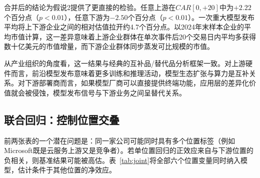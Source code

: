\documentclass[11pt,fontset=fandol,a4paper]{ctexart}
\newcommand{\changed}[1]{#1}
\begin{document}
合并后的结论为假说2提供了更直接的检验。任意上游在$CAR[0,+20]$中为$+2.22$个百分点（$p<0.01$），任意下游为$-2.50$个百分点（$p<0.01$）。一次重大模型发布平均将上下游企业之间的相对估值拉开约4.7个百分点。以2024年末样本企业的平均市值计算，这一差异意味着上游企业群体在单次事件后20个交易日内平均多获得数十亿美元的市值增量，而下游企业群体同步蒸发可比规模的市值。

\changed{从产业组织的角度看，这一结果与经典的互补品/替代品分析框架一致。对上游硬件而言，前沿模型发布意味着更多训练和推理活动，模型生态扩张与算力是互补关系。对下游部署商而言，如果模型厂商可以直接提供终端功能，应用层的差异化价值就会被侵蚀，模型发布信号与下游业务之间呈替代关系。}

\subsection{联合回归：控制位置交叠}\label{sec:joint}

前两张表的一个潜在问题是：同一家公司可能同时具有多个位置标签（例如Microsoft既是云服务上游又是竞争者）。若单位置回归的正效应来自与下游位置的负相关，则基准结果可能被高估。表~\ref{tab:joint}将全部六个位置变量同时纳入模型，估计条件于其他位置的净效应。
\end{document}
